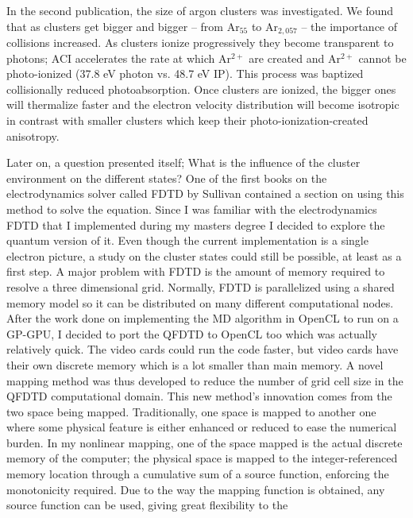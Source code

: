 In the second publication, the size of argon clusters was investigated. We found
that as clusters get bigger and bigger -- from Ar$_{55}$ to Ar$_{2,057}$ --
the importance of collisions increased. As clusters ionize progressively they
become transparent to photons; ACI accelerates the rate at which Ar$^{2+}$ are
created and Ar$^{2+}$ cannot be photo-ionized (37.8 eV photon vs. 48.7 eV IP).
This process was baptized collisionally reduced photoabsorption. Once clusters
are ionized, the bigger ones will thermalize faster and the electron velocity
distribution will become isotropic in contrast with smaller clusters which
keep their photo-ionization-created anisotropy.


Later on, a question presented itself; What is the influence of the cluster
environment on the different states? One of the first books on the
electrodynamics solver called FDTD by Sullivan contained a section on using
this method to solve the \schrodinger equation. Since I was familiar with
the electrodynamics FDTD that I implemented during my masters degree I decided
to explore the quantum version of it. Even though the current implementation is
a single electron picture, a study on the cluster states could still be possible,
at least as a first step. A major problem with FDTD is the amount of memory
required to resolve a three dimensional grid. Normally, FDTD is parallelized
using a shared memory model so it can be distributed on many different
computational nodes. After the work done on implementing the MD algorithm in
OpenCL to run on a GP-GPU, I decided to port the QFDTD to OpenCL too
which was actually relatively quick. The video cards could run the code faster,
but video cards have their own discrete memory which is a lot smaller than main
memory. A novel mapping method was thus developed to reduce the number of grid
cell size in the QFDTD computational domain. This new method's innovation comes
from the two space being mapped. Traditionally, one space is mapped to another
one where some physical feature is either enhanced or reduced to ease the numerical
burden. In my nonlinear mapping, one of the space mapped is the actual
discrete memory of the computer; the physical space is mapped to the
integer-referenced memory location through a cumulative sum of a source function,
enforcing the monotonicity required. Due to the way the mapping function is
obtained, any source function can be used, giving great flexibility to the
